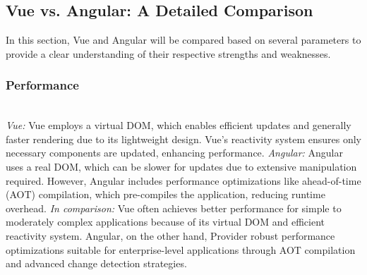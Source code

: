 \documentclass[conference]{IEEEtran}
\begin{document}




\subsection{Vue vs. Angular: A Detailed Comparison}

In this section, Vue and Angular will be compared based on several parameters to provide a clear understanding of their respective strengths and weaknesses.
\newline
\subsubsection{Performance}

\textit{\\Vue:} Vue employs a virtual DOM, which enables efficient updates and generally faster rendering due to its lightweight design. Vue’s reactivity system ensures only necessary components are updated, enhancing performance.
\newline\textit{Angular:} Angular uses a real DOM, which can be slower for updates due to extensive manipulation required. However, Angular includes performance optimizations like ahead-of-time (AOT) compilation, which pre-compiles the application, reducing runtime overhead.
\newline\textit{In comparison:} Vue often achieves better performance for simple to moderately complex applications because of its virtual DOM and efficient reactivity system. Angular, on the other hand, Provider robust performance optimizations suitable for enterprise-level applications through AOT compilation and advanced change detection strategies.
\newline
\end{document}

